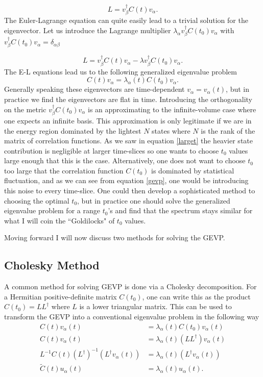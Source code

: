 \documentclass[onecolumn,article,preprintnumbers]{revtex4-1}
\begin{document}
\begin{equation}
L = v_{\beta}^{\dag}C(t)v_{\alpha}.
\end{equation}
The Euler-Lagrange equation can quite easily lead to a trivial solution for the eigenvector. Let us introduce the Lagrange multiplier $\lambda_{\alpha} v^{\dag}_{\beta}C(t_0)v_{\alpha}$ with $v^{\dag}_{\beta}C(t_0)v_{\alpha}=\delta_{\alpha\beta}$

\begin{equation}
L =  v_{\beta}^{\dag}C(t)v_{\alpha} - \lambda v_{\beta}^{\dag}C(t_0)v_{\alpha}.
\end{equation}
The E-L equations lead us to the following generalized eigenvalue problem
\begin{equation}
C(t)v_{\alpha} = \lambda_{\alpha}(t)C(t_0)v_{\alpha}\label{gevp}.
\end{equation}
Generally speaking these eigenvectors are time-dependent $v_{\alpha} = v_{\alpha}(t)$, but in practice we find the eigenvectors are flat in time. Introducing the orthogonality on the metric $v^{\dag}_{\beta}C(t_0)v_{\alpha}$ is an approximating to the infinite-volume case where one expects an infinite basis. This approximation is only legitimate if we are in the energy region dominated by the lightest $N$ states where $N$ is the rank of the matrix of correlation functions. As we saw in equation \ref{larget} the heavier state contribution is negligible at larger time-slices so one wants to choose $t_0$ values large enough that this is the case. Alternatively, one does not want to choose $t_0$ too large that the correlation function $C(t_0)$ is dominated by statistical fluctuation, and as we can see from equation \ref{gevp}, one would be introducing this noise to every time-slice. One could then develop a sophisticated method to choosing the optimal $t_0$, but in practice one should solve the generalized eigenvalue problem for a range $t_0$'s and find that the spectrum stays similar for what I will coin the ``Goldilocks" of $t_0$ values. 

Moving forward I will now discuss two methods for solving the GEVP.

\subsection{Cholesky Method}

A common method for solving GEVP is done via a Cholesky decomposition. For a Hermitian positive-definite matrix $C(t_0)$, one can write this as the product $C(t_0)=LL^{\dag}$ where $L$ is a lower triangular matrix. This can be used to transform the GEVP into a conventional eigenvalue problem in the following way
\begin{align}
C(t)v_{\alpha}(t)&=\lambda_{\alpha}(t)C(t_0)v_{\alpha}(t) \\
C(t)v_{\alpha}(t)&=\lambda_{\alpha}(t)\left(LL^{\dag}\right)v_{\alpha}(t) \\
L^{-1}C(t)(L^{\dag})^{-1}(L^{\dag}v_{\alpha}(t))& = \lambda_{\alpha}(t)(L^{\dag}v_{\alpha}(t))\\
\tilde{C}(t)u_{\alpha}(t)&=\lambda_{\alpha}(t)u_{\alpha}(t).
\end{align}
\end{document}
